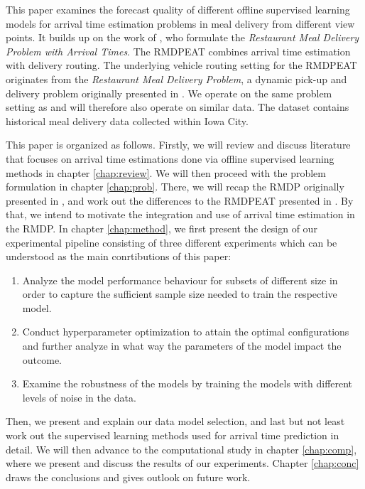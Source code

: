 This paper examines the forecast quality of different offline supervised learning models for arrival time estimation problems in meal delivery from different view points. It builds up on the work of \cite{Hildebrandt2020_EAT}, who formulate the \textit{Restaurant Meal Delivery Problem with Arrival Times}. The RMDPEAT combines arrival time estimation with delivery routing. The underlying vehicle routing setting for the RMDPEAT originates from the \textit{Restaurant Meal Delivery Problem}, a dynamic pick-up and delivery problem originally presented in \cite{UlmerRMDP}. We operate on the same problem setting as \cite{Hildebrandt2020_EAT} and will therefore also operate on similar data. The dataset contains historical meal delivery data collected within Iowa City.  

This paper is organized as follows. Firstly, we will review and discuss literature that focuses on arrival time estimations done via offline supervised learning methods in chapter \ref{chap:review}. We will then proceed with the problem formulation in chapter \ref{chap:prob}. There, we will recap the RMDP originally presented in \cite{UlmerRMDP}, and work out the differences to the RMDPEAT presented in \cite{Hildebrandt2020_EAT}. By that, we intend to motivate the integration and use of arrival time estimation in the RMDP. In chapter \ref{chap:method}, we first present the design of our experimental pipeline consisting of three different experiments which can be understood as the main conrtibutions of this paper:
\begin{enumerate}
	\item Analyze the model performance behaviour for subsets of different size in order to capture the sufficient sample size needed to train the respective model.
	\item Conduct hyperparameter optimization to attain the optimal configurations and further analyze in what way the parameters of the model impact the outcome. 
	\item Examine the robustness of the models by training the models with different levels of noise in the data.
\end{enumerate}
Then, we present and explain our data model selection, and last but not least work out the supervised learning methods used for arrival time prediction in detail. We will then advance to the computational study in chapter \ref{chap:comp}, where we present and discuss the results of our experiments.
Chapter \ref{chap:conc} draws the conclusions and gives outlook on future work.
 